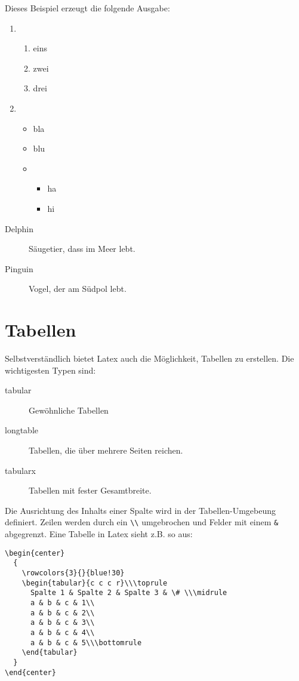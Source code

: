 \newpage
Dieses Beispiel erzeugt die folgende Ausgabe:
\begin{enumerate}
\item
  \begin{enumerate}
  \item eins
  \item zwei
  \item drei
  \end{enumerate}
\item
  \begin{itemize}
  \item bla
  \item blu
  \item
    \begin{itemize}
    \item ha
    \item hi
    \end{itemize}
  \end{itemize}
\end{enumerate}
\begin{description}
\item[Delphin] Säugetier, dass im Meer lebt.
\item[Pinguin] Vogel, der am Südpol lebt. 
\end{description}

\section{Tabellen}
Selbstverständlich bietet Latex auch die Möglichkeit, Tabellen zu erstellen. Die wichtigesten Typen sind:
\begin{description}
\item[tabular] Gewöhnliche Tabellen
\item[longtable] Tabellen, die über mehrere Seiten reichen.
\item[tabularx] Tabellen mit fester Gesamtbreite.
\end{description}
Die Ausrichtung des Inhalts einer Spalte wird in der Tabellen-Umgebeung definiert. Zeilen werden durch ein
\verb+\\+ umgebrochen und Felder mit einem \verb+&+ abgegrenzt. Eine Tabelle in Latex sieht z.B. so aus:
\begin{verbatim}
\begin{center}
  {
    \rowcolors{3}{}{blue!30}
    \begin{tabular}{c c c r}\\\toprule
      Spalte 1 & Spalte 2 & Spalte 3 & \# \\\midrule
      a & b & c & 1\\
      a & b & c & 2\\
      a & b & c & 3\\
      a & b & c & 4\\
      a & b & c & 5\\\bottomrule
    \end{tabular}
  }
\end{center}
\end{verbatim}

